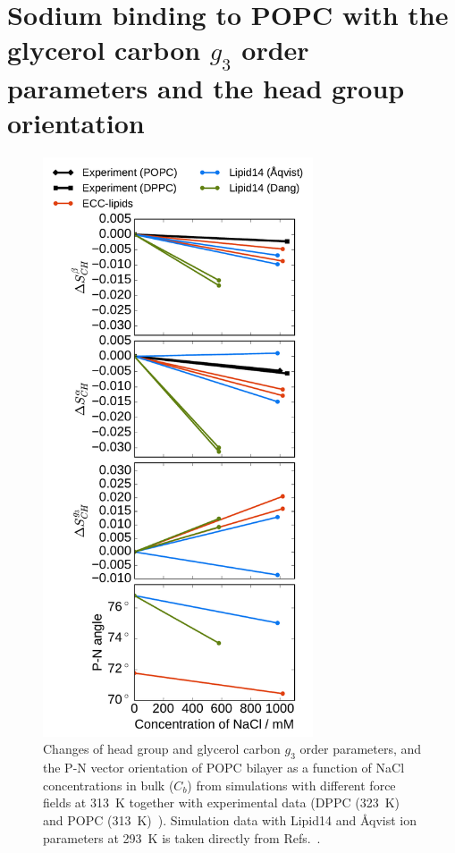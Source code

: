 \documentclass[journal=jpcbfk]{achemso}
\begin{document}
\newpage
\section{Sodium binding to POPC with the glycerol carbon $g_3$ order parameters and the head group orientation}

\begin{figure}[!h]
  \centering
  \includegraphics[width=8.0cm]{../Fig/ipython_nb/PN_angle_OrdPars-A-B-g3_L14-ECCL17_q80_sig89_NaCl.pdf}
  \caption{\label{fig:delta_ordPar_NaCl_si}
    Changes of head group and glycerol carbon $g_3$ order parameters, and the P-N vector orientation of POPC bilayer
    as a function of NaCl concentrations in bulk ($C_b$)
    from simulations with different force fields at 313~K together with experimental
    data (DPPC (323~K)~\cite{akutsu81} and POPC (313~K)~\cite{altenbach84}). 
    Simulation data with Lipid14 and \AA{}qvist ion parameters at 293~K is taken directly
    from Refs.~.
  }
\end{figure}
\end{document}
